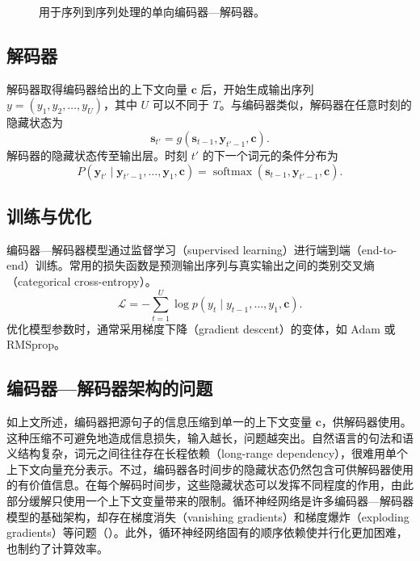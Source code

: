 \begin{figure}[!htbp]
\centering

\caption{用于序列到序列处理的单向编码器—解码器。}
\label{fig:ch02-encoder-decoder}
\end{figure}

\subsection{解码器}
解码器取得编码器给出的上下文向量 $\symbf{c}$ 后，开始生成输出序列 $y=(y_1,y_2,\ldots,y_U)$，其中 $U$ 可以不同于 $T$。与编码器类似，解码器在任意时刻的隐藏状态为
\begin{equation}
\symbf{s}_{t'}=g(\symbf{s}_{t-1},\symbf{y}_{t'-1},\symbf{c}).
\tag{2.4}
\end{equation}
解码器的隐藏状态传至输出层。时刻 $t'$ 的下一个词元的条件分布为
\begin{equation}
P(\symbf{y}_{t'}\mid \symbf{y}_{t'-1},\ldots,\symbf{y}_1,\symbf{c})
=\operatorname{softmax}(\symbf{s}_{t-1},\symbf{y}_{t'-1},\symbf{c}).
\tag{2.5}
\end{equation}

\subsection{训练与优化}
编码器—解码器模型通过监督学习（supervised learning）进行端到端（end-to-end）训练。常用的损失函数是预测输出序列与真实输出之间的类别交叉熵（categorical cross-entropy）。
\begin{equation}
\mathcal{L}=-\sum_{t=1}^{U}\log p(y_t\mid y_{t-1},\ldots,y_1,\symbf{c}).
\tag{2.6}
\end{equation}
优化模型参数时，通常采用梯度下降（gradient descent）的变体，如 Adam 或 RMSprop。

\subsection{编码器—解码器架构的问题}
如上文所述，编码器把源句子的信息压缩到单一的上下文变量 $\symbf{c}$，供解码器使用。这种压缩不可避免地造成信息损失，输入越长，问题越突出。自然语言的句法和语义结构复杂，词元之间往往存在长程依赖（long-range dependency），很难用单个上下文向量充分表示。不过，编码器各时间步的隐藏状态仍然包含可供解码器使用的有价值信息。在每个解码时间步，这些隐藏状态可以发挥不同程度的作用，由此部分缓解只使用一个上下文变量带来的限制。循环神经网络是许多编码器—解码器模型的基础架构，却存在梯度消失（vanishing gradients）和梯度爆炸（exploding gradients）等问题（）。此外，循环神经网络固有的顺序依赖使并行化更加困难，也制约了计算效率。

